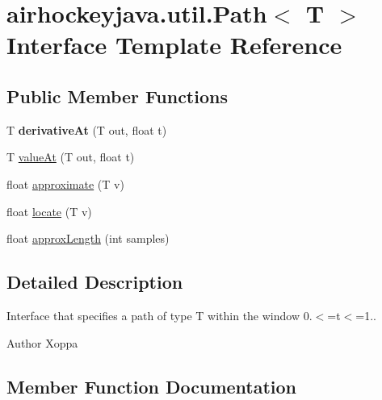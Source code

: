 \hypertarget{interfaceairhockeyjava_1_1util_1_1_path}{}\section{airhockeyjava.\+util.\+Path$<$ T $>$ Interface Template Reference}
\label{interfaceairhockeyjava_1_1util_1_1_path}
\subsection*{Public Member Functions}
\begin{DoxyCompactItemize}
\item 
\hypertarget{interfaceairhockeyjava_1_1util_1_1_path_ac3387dedcd3df040b1bd3dad6582031c}{}T {\bfseries derivative\+At} (T out, float t)\label{interfaceairhockeyjava_1_1util_1_1_path_ac3387dedcd3df040b1bd3dad6582031c}

\item 
T \hyperlink{interfaceairhockeyjava_1_1util_1_1_path_a960a99fb6db71cd6f87c02d67a62720d}{value\+At} (T out, float t)
\item 
float \hyperlink{interfaceairhockeyjava_1_1util_1_1_path_a8153b4e4af7b49b4773867dd7f38e812}{approximate} (T v)
\item 
float \hyperlink{interfaceairhockeyjava_1_1util_1_1_path_a1993d2138e316de3b5ebd602a89c456c}{locate} (T v)
\item 
float \hyperlink{interfaceairhockeyjava_1_1util_1_1_path_a2f438ab1981d028955a80b495dda9160}{approx\+Length} (int samples)
\end{DoxyCompactItemize}


\subsection{Detailed Description}
Interface that specifies a path of type T within the window 0.$<$=t$<$=1.. \begin{DoxyAuthor}{Author}
Xoppa 
\end{DoxyAuthor}


\subsection{Member Function Documentation}
\hypertarget{interfaceairhockeyjava_1_1util_1_1_path_a8153b4e4af7b49b4773867dd7f38e812}{}
